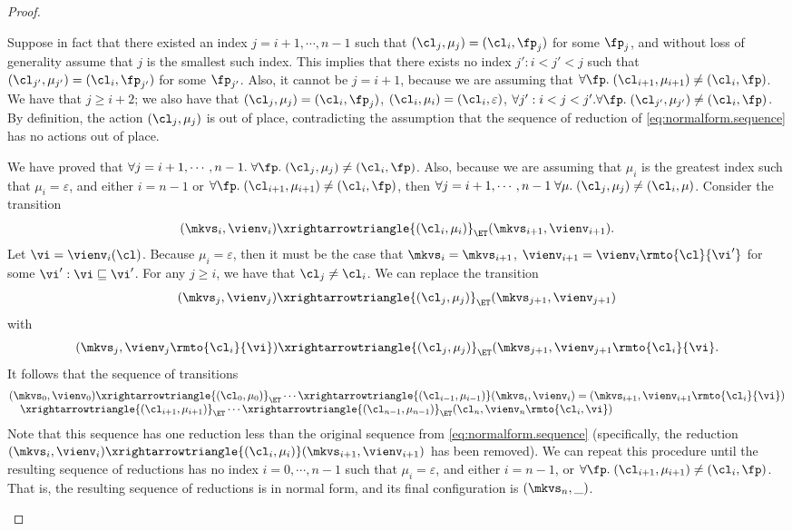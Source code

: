 \begin{proof}
\begin{enumerate}
Suppose in fact that there existed 
an index $j = i+1,\cdots, n-1$ such that $(\cl_{j}, \mu_{j}) = (\cl_{i}, \fp_{j})$ for some 
$\fp_{j}$, and without loss of generality assume that $j$ is the smallest such index. This implies that 
there exists no index $j': i < j' < j$ such that $(\cl_{j'}, \mu_{j'}) = (\cl_{i}, \fp_{j'})$ for some 
$\fp_{j'}$. Also, it cannot be $j = i+1$, because we are assuming that $\forall \fp.\;(\cl_{i+1}, \mu_{i+1}) \neq 
(\cl_{i}, \fp)$.  We have that $j \geq i+2$; we also have that  $(\cl_{j}, \mu_{j}) = (\cl_{i}, \fp_{j})$, 
$(\cl_{i}, \mu_{i}) = (\cl_{i}, \varepsilon)$, $\forall j': i < j < j'.\forall \fp.\; (\cl_{j'}, \mu_{j'}) \neq (\cl_{i}, \fp)$. 
By definition, the action $(\cl_{j}, \mu_{j})$ is out of place, contradicting the assumption that the sequence of 
reduction of \cref{eq:normalform.sequence} has no actions out of place.

We have proved that $\forall j = i+1, \cdots, n-1.\;\forall \fp.\;(\cl_{j}, \mu_{j}) \neq (\cl_{i}, \fp)$. 
Also, because we are assuming that $\mu_{i}$ is the greatest index such that $\mu_{i} = \varepsilon$, 
and either $i= n-1$ or $\forall \fp.\;(\cl_{i+1},\mu_{i+1}) \neq (\cl_{i}, \fp)$, 
then $\forall j=i+1,\cdots, n-1\;\forall \mu.\;(\cl_{j}, \mu_{j}) \neq (\cl_{i}, \mu)$. 
Consider the transition 
\[
(\mkvs_{i}, \vienv_{i}) \xrightarrowtriangle{(\cl_{i}, \mu_{i})}_{\ET} (\mkvs_{i+1}, \vienv_{i+1}).
\]
Let $\vi = \vienv_{i}(\cl)$. Because $\mu_{i} = \varepsilon$, then it must be the case that 
$\mkvs_{i} = \mkvs_{i+1}$, $\vienv_{i+1} = \vienv_{i}\rmto{\cl}{\vi'}$ for some $\vi' : \vi \sqsubseteq \vi'$. 
For any $j \geq i$, we have that $\cl_{j} \neq \cl_{i}$. We can replace the transition 
\[
(\mkvs_{j}, \vienv_{j}) \xrightarrowtriangle{(\cl_{j}, \mu_{j})}_{\ET} (\mkvs_{j+1}, \vienv_{j+1})
\]
with 
\[
(\mkvs_{j}, \vienv_{j}\rmto{\cl_{i}}{\vi}) \xrightarrowtriangle{(\cl_{j}, \mu_{j})}_{\ET} (\mkvs_{j+1}, \vienv_{j+1}\rmto{\cl_{i}}{\vi}.
\]
It follows that the sequence of transitions 
\[ 
\begin{array}{@{}l@{}}
(\mkvs_{0}, \vienv_{0}) \xrightarrowtriangle{(\cl_{0}, \mu_{0})}_{\ET} \cdots \xrightarrowtriangle{(\cl_{i-1},\mu_{i-1})} 
(\mkvs_{i}, \vienv_{i}) = (\mkvs_{i+1}, \vienv_{i+1}\rmto{\cl_{i}}{\vi})  \\
\quad \xrightarrowtriangle{(\cl_{i+1}, \mu_{i+1})}_{\ET} \cdots 
\xrightarrowtriangle{(\cl_{n-1}, \mu_{n-1})}_{\ET} (\cl_{n}, \vienv_{n}\rmto{\cl_{i}, \vi})
\end{array}
\]
Note that this sequence has one reduction less than the original sequence from \eqref{eq:normalform.sequence} (specifically, 
the reduction $(\mkvs_{i}, \vienv_{i}) \xrightarrowtriangle{(\cl_{i}, \mu_{i})} (\mkvs_{i+1}, \vienv_{i+1})$ has 
been removed). We can repeat this procedure until the resulting sequence of reductions has no index $i=0,\cdots, n-1$ such that  
$\mu_{i} = \varepsilon$, and either $i = n-1$, or 
$\forall \fp.\; (\cl_{i+1}, \mu_{i+1}) \neq (\cl_{i}, \fp)$. That is, the resulting sequence of reductions is in normal form, 
and its final configuration is $(\mkvs_{n}, \_)$.


\end{enumerate}
\end{proof}
